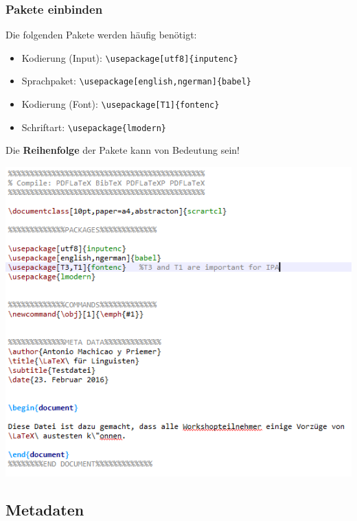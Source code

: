 \begin{frame}[fragile]
\frametitle{Pakete einbinden}

Die folgenden Pakete werden häufig benötigt:
\begin{itemize}
	
	\item Kodierung (Input): 
	\lstinline|\usepackage[utf8]{inputenc}|
	
	\item Sprachpaket: 
	\lstinline|\usepackage[english,ngerman]{babel}|

	\item Kodierung (Font): 
	\lstinline|\usepackage[T1]{fontenc}|
	
	\item Schriftart: 
	\lstinline|\usepackage{lmodern}|
\end{itemize}

Die \textbf{Reihenfolge} der Pakete kann von Bedeutung sein! 

\end{frame}


\begin{frame}[fragile]

\centering
\includegraphics[width=0.75\linewidth]{../../texfiles-beamer/tex-material/WissArb-latex/latexTest3tex}


\end{frame}


\subsection{Metadaten}

